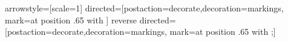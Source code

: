 \usepackage[utf8]{inputenc}

\usepackage{chapterbib}
\usepackage{amsmath}
\usepackage{xparse} %
\usepackage{amsthm}
\usepackage{amssymb}
\usepackage{algorithm}
\usepackage{algorithmic}
\usepackage{physics}

\usepackage{tikz}
\usepackage{tikz-cd}
\usetikzlibrary{calc,trees,positioning,arrows,fit,shapes,matrix}
\usetikzlibrary{arrows,shapes,positioning}
\usetikzlibrary{decorations.markings}
\tikzstyle arrowstyle=[scale=1]
\tikzstyle directed=[postaction={decorate,decoration={markings,
    mark=at position .65 with {}}}]
\tikzstyle reverse directed=[postaction={decorate,decoration={markings,
    mark=at position .65 with {;}}}]
